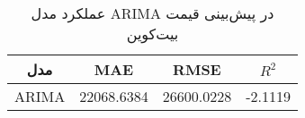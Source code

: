 
        \begin{table}[H]
            \centering
            \begin{tabular}{|c|c|c|c|}
                
                \hline
                \textbf{مدل} & \textbf{MAE} & \textbf{RMSE} & \textbf{ \(R^2\) } \\
                
                \hline
                ARIMA & 22068.6384 & 26600.0228 & -2.1119 \\
                
                \hline
            \end{tabular}
            \caption{عملکرد مدل ARIMA در پیش‌بینی قیمت بیت‌کوین}
            \label{tab:arima_performance}
        \end{table}
        